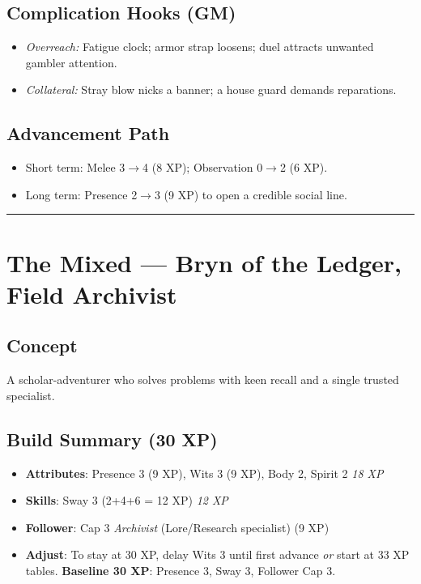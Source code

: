 \documentclass[12pt]{book}
\begin{document}
\subsection*{Complication Hooks (GM)}
\begin{itemize}
  \item \emph{Overreach:} Fatigue clock; armor strap loosens; duel attracts unwanted gambler attention.
  \item \emph{Collateral:} Stray blow nicks a banner; a house guard demands reparations.
\end{itemize}

\subsection*{Advancement Path}
\begin{itemize}
  \item Short term: Melee 3$\rightarrow$4 (8 XP); Observation 0$\rightarrow$2 (6 XP).
  \item Long term: Presence 2$\rightarrow$3 (9 XP) to open a credible social line.
\end{itemize}

\bigskip
\hrule
\bigskip

\section{The Mixed — Bryn of the Ledger, Field Archivist}

\subsection*{Concept}
A scholar-adventurer who solves problems with keen recall and a single trusted specialist.

\subsection*{Build Summary (30 XP)}
\begin{itemize}
  \item \textbf{Attributes}: Presence 3 (9 XP), Wits 3 (9 XP), Body 2, Spirit 2 \hfill \emph{18 XP}
  \item \textbf{Skills}: Sway 3 (2+4+6 = 12 XP) \hfill \emph{12 XP}
  \item \textbf{Follower}: Cap 3 \emph{Archivist} (Lore/Research specialist) (9 XP)
  \item \textbf{Adjust}: To stay at 30 XP, delay Wits 3 until first advance \emph{or} start at 33 XP tables. \textbf{Baseline 30 XP}: Presence 3, Sway 3, Follower Cap 3.
\end{itemize}
\end{document}
